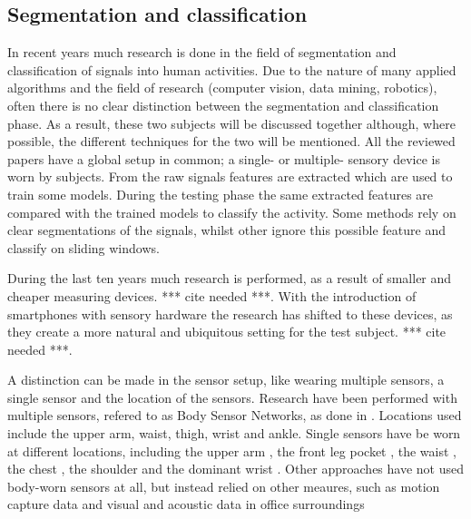 \subsection{Segmentation and classification}\label{sec:lit_review_segmentation}
In recent years much research is done in the field of segmentation and classification of signals into human activities.
Due to the nature of many applied algorithms and the field of research (computer vision, data mining, robotics), often there is no clear distinction between the segmentation and classification phase.
As a result, these two subjects will be discussed together although, where possible, the different techniques for the two will be mentioned.
All the reviewed papers have a global setup in common; a single- or multiple- sensory device is worn by subjects.
From the raw signals features are extracted which are used to train some models.
During the testing phase the same extracted features are compared with the trained models to classify the activity.
Some methods rely on clear segmentations of the signals, whilst other ignore this possible feature and classify on sliding windows.

During the last ten years much research is performed, as a result of smaller and cheaper measuring devices. *** cite needed ***.
With the introduction of smartphones with sensory hardware the research has shifted to these devices, as they create a more natural and ubiquitous setting for the test subject. *** cite needed ***.

A distinction can be made in the sensor setup, like wearing multiple sensors, a single sensor and the location of the sensors.
Research have been performed with multiple sensors, refered to as Body Sensor Networks, as done in \cite{guenterberg2009automatic, guenterberg2009distributed, bao2004activity, sherril2005using}.
Locations used include the upper arm, waist, thigh, wrist and ankle.
Single sensors have be worn at different locations, including the upper arm \cite{krause2003unsupervised}, the front leg pocket \cite{kwapisz2011activity, duque2012offline, siirtola2012recognizing, he2009activity}, the waist \cite{ravi2005activity, lester2006practical, lee2178physical}, the chest \cite{ahmed2012non, himberg2001time}, the shoulder \cite{lester2005hybrid} and the dominant wrist \cite{yang2008using, long2009single}.
Other approaches have not used body-worn sensors at all, but instead relied on other meaures, such as motion capture data \cite{barbivc2004segmenting, zhou2008aligned} and visual \cite{perdikis2008recognition} and acoustic data in office surroundings \cite{oliver2002layered}

